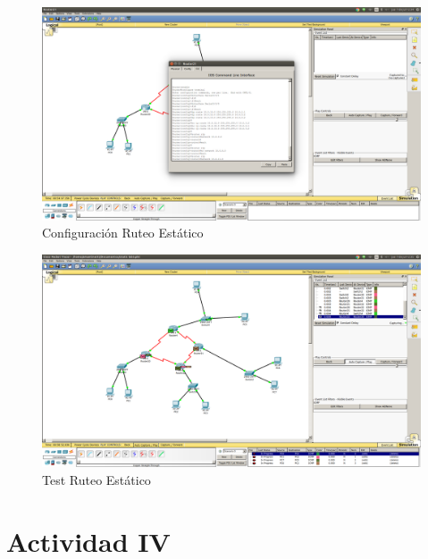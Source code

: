 \documentclass[spanish]{udpreport}
\begin{document}
\begin{figure}[H]
	\centering
	\includegraphics[scale=.25]{imagenes/ruteo_estatico.png}
	\caption{Configuración Ruteo Estático}
	\label{fig:Figura 4.1}
\end{figure}

\begin{figure}[H]
	\centering
	\includegraphics[scale=.25]{imagenes/test_restatico.png}
	\caption{Test Ruteo Estático}
	\label{fig:Figura 4.2}
\end{figure}

\pagebreak

\section{Actividad IV}
\end{document}
